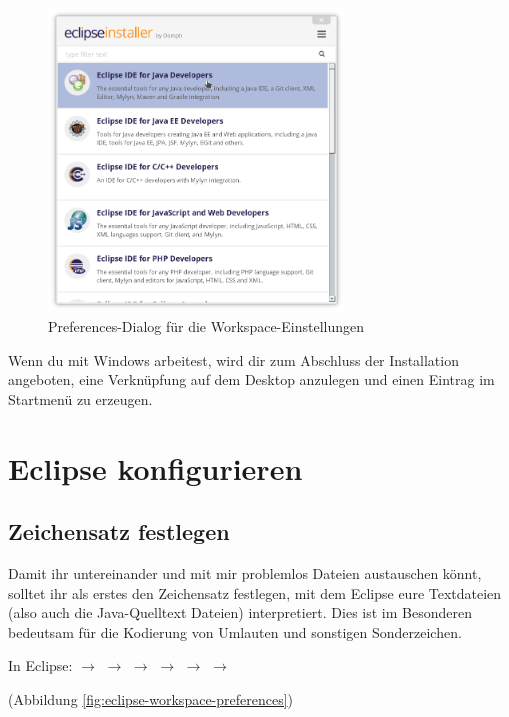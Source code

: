 \begin{figure}[h]
  \centering
  \includegraphics[width=0.7\textwidth]{./inf/SEKII/01_Vorbereitung/Eclipse-Installer.png}
  \caption{Preferences-Dialog für die Workspace-Einstellungen}
  \label{fig:eclipse-installer}
\end{figure}

Wenn du mit Windows arbeitest, wird dir zum Abschluss der Installation angeboten, eine Verknüpfung 
auf dem Desktop anzulegen und einen Eintrag im Startmenü zu erzeugen.


\section{Eclipse konfigurieren}

\subsection{Zeichensatz festlegen}

Damit ihr untereinander und mit mir problemlos Dateien austauschen könnt,
solltet ihr als erstes den Zeichensatz festlegen, mit dem Eclipse eure
Textdateien (also auch die Java-Quelltext Dateien) interpretiert. Dies ist im
Besonderen bedeutsam für die Kodierung von Umlauten und sonstigen
Sonderzeichen.

In Eclipse:  $\rightarrow$  $\rightarrow$
 $\rightarrow$  $\rightarrow$  $\rightarrow$  $\rightarrow$ 

(Abbildung \ref{fig:eclipse-workspace-preferences}) 

